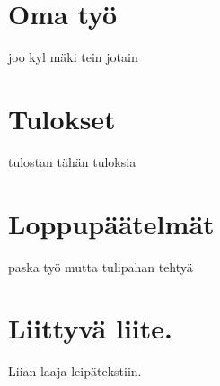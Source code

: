 \documentclass[12pt,a4paper]{article}
\begin{document}
\section{Oma työ}
joo kyl mäki tein jotain


\section{Tulokset}
tulostan tähän tuloksia


\section{Loppupäätelmät}
paska työ mutta tulipahan tehtyä




\appendix
\newpage
\section{Liittyvä liite.} \label{koodi}
Liian laaja leipätekstiin.
\end{document}
